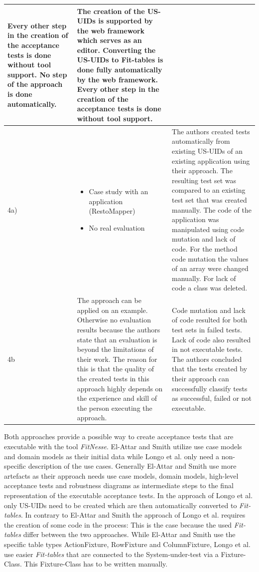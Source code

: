 \begin{small}
\begin{longtable}[h]{p{0.45cm}|p{}|p{}}
Every other step in the creation of the acceptance tests is done without tool support.
No step of the approach is done automatically.
 & The creation of the US-UIDs is supported by the web framework which serves as an editor.
Converting the US-UIDs to Fit-tables is done fully automatically by the web framework.
Every other step in the creation of the acceptance tests is done without tool support.
 \\
  \hline
  4a) & 
  	\begin{itemize} 
  		\item Case study with an application (RestoMapper)
		\item	No real evaluation 
	\end{itemize}
 & The authors created tests automatically from existing US-UIDs of an existing application using their approach.
The resulting test set was compared to an existing test set that was created manually.
The code of the application was manipulated using code mutation and lack of code.
For the method code mutation the values of an array were changed manually. For lack of code a class was deleted.
 \\
  \hline
  		 4b & The approach can be applied on an example.
Otherwise no evaluation results because the authors state that an evaluation is beyond the limitations of their work.
The reason for this is that the quality of the created tests in this approach highly depends on the experience and skill of the person executing the approach.
 & Code mutation and lack of code resulted for both test sets in failed tests.
Lack of code also resulted in not executable tests.
The authors concluded that the tests created by their approach can successfully classify tests as successful, failed or not executable.
 \\
  \hline
\end{longtable}
\end{small}

Both approaches provide a possible way to create acceptance tests that are executable with the tool \textit{FitNesse}.
El-Attar and Smith utilize use case models and domain models as their initial data while Longo et al. only need a non-specific description of the use cases.
Generally El-Attar and Smith use more artefacts as their approach needs use case models, domain models, high-level acceptance tests and robustness diagrams as intermediate steps to the final representation of the executable acceptance tests.
In the approach of Longo et al. only US-UIDs need to be created which are then automatically converted to \textit{Fit-tables}.
In contrary to El-Attar and Smith the approach of Longo et al. requires the creation of some code in the process:
This is the case because the used \textit{Fit-tables} differ between the two approaches.
While El-Attar and Smith use the specific table types ActionFixture, RowFixture and ColumnFixture, Longo et al. use easier \textit{Fit-tables} that are connected to the System-under-test via a Fixture-Class.
This Fixture-Class has to be written manually.

